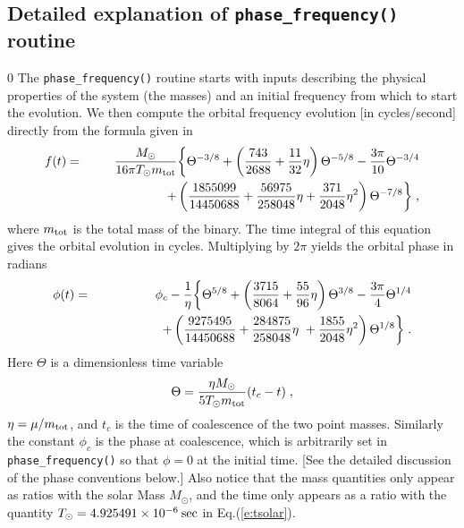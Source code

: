 \subsection{Detailed explanation of {\tt phase\_frequency()} routine}
\setcounter{equation}0
The {\tt phase\_frequency()} routine starts with inputs describing
the physical properties of the system (the masses)
and an initial frequency from which to start the evolution.
We then compute the orbital frequency evolution [in cycles/second] directly
from the formula given in \cite{biww}
\begin{eqnarray}
\label{e:frequencyns}
f(t)&=& {M_\odot \over 16 \pi  T_\odot m_{\rm tot}} 
\biggl\{ \Theta^{-3/8} +\left({743\over 2688}
 + {11\over 32}\eta \right) \Theta^{-5/8} - {3\pi \over 10} \Theta^{-3/4} \nonumber \\
&&\qquad\qquad\qquad+ \left( {1855099\over 14450688}
+ {56975\over 258048} \eta + {371\over 2048} \eta^2 \right) \Theta^{-7/8}
\biggr\} \;,
\end{eqnarray}
where $m_{\rm tot}$ is the total mass of the binary.  The time integral
of this equation gives the orbital evolution in cycles.  Multiplying by
$2 \pi$ yields the orbital phase in radians
\begin{eqnarray}
\label{e:phasens}
\phi (t) &=&\phi_c -{1\over\eta} \biggl\{ \Theta^{5/8} +\left({3715\over 8064}
 + {55\over 96}\eta \right) \Theta^{3/8} 
 - {3\pi \over 4} \Theta^{1/4}  \nonumber \\
&&\qquad\qquad\quad+\left({9275495\over 14450688}+{284875\over 258048}
\eta\ +{1855\over 2048} \eta^2 \right) \Theta^{1/8} \biggr\}\;.
\end{eqnarray}
Here $\Theta$ is a dimensionless time variable
\begin{equation}
\label{e:theta}
\Theta={\eta M_\odot \over 5 T_\odot m_{\rm tot}} (t_c-t) \; ,
\end{equation}
$\eta = \mu/m_{\rm tot}$, and $t_c$ is the time of coalescence of the
two point masses. 
Similarly the constant $\phi_c$ is the 
phase at coalescence, which is arbitrarily set 
in {\tt phase\_frequency()} so that $\phi=0$
at the initial time.
[See the detailed discussion of the phase conventions below.]
Also notice that the mass quantities only appear as ratios with the 
solar Mass $M_\odot$, and the time only appears as a ratio with
the quantity $T_\odot = 4.925491\times 10^{-6}\> \rm sec$ in 
Eq.(\ref{e:tsolar}). 

